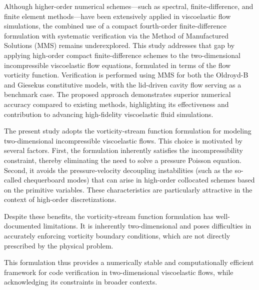 \documentclass[preprint, 12pt]{elsarticle}
\begin{document}
{\color{red} Although higher-order numerical schemes—such as spectral,
finite-di\-ffe\-ren\-ce, and finite element methods—have been extensively
applied in viscoelastic flow simulations, the combined use of a compact
fourth-order finite-difference formulation with systematic verification via the
Method of Manufactured Solutions (MMS) remains underexplored. This study
addresses that gap by applying high-order compact finite-difference schemes to
the two-dimensional incompressible viscoelastic flow equations, formulated in
terms of the flow vorticity function. Verification is performed using MMS for
both the Oldroyd-B and Giesekus constitutive models, with the lid-driven cavity
flow serving as a benchmark case. The proposed approach demonstrates superior
numerical accuracy compared to existing methods, highlighting its effectiveness
and contribution to advancing high-fidelity viscoelastic fluid simulations.

The present study adopts the vorticity-stream function formulation for modeling
two-dimensional incompressible viscoelastic flows. This choice is motivated by
several factors. First, the formulation inherently satisfies the
incompressibility constraint, thereby eliminating the need to solve a pressure
Poisson equation. Second, it avoids the pressure-velocity decoupling
instabilities (such as the so-called chequerboard modes) that can arise in
high-order collocated schemes based on the primitive variables. These
characteristics are particularly attractive in the context of high-order
discretizations.

Despite these benefits, the vorticity-stream function formulation has
well-documented limitations. It is inherently two-dimensional and poses
difficulties in accurately enforcing vorticity boundary conditions, which are
not directly prescribed by the physical problem.

This formulation thus provides a numerically stable and computationally
efficient framework for code verification in two-dimensional viscoelastic
flows, while acknowledging its constraints in broader contexts.}
\end{document}
